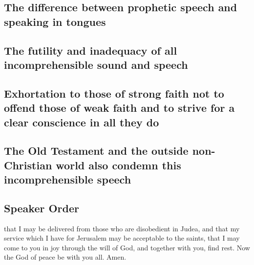 \hypertarget{the-difference-between-prophetic-speech-and-speaking-in-tongues}{%
\subsection{The difference between prophetic speech and speaking in
tongues}\label{the-difference-between-prophetic-speech-and-speaking-in-tongues}}

\hypertarget{the-futility-and-inadequacy-of-all-incomprehensible-sound-and-speech}{%
\subsection{The futility and inadequacy of all incomprehensible sound
and
speech}\label{the-futility-and-inadequacy-of-all-incomprehensible-sound-and-speech}}

\hypertarget{exhortation-to-those-of-strong-faith-not-to-offend-those-of-weak-faith-and-to-strive-for-a-clear-conscience-in-all-they-do}{%
\subsection{Exhortation to those of strong faith not to offend those of
weak faith and to strive for a clear conscience in all they
do}\label{exhortation-to-those-of-strong-faith-not-to-offend-those-of-weak-faith-and-to-strive-for-a-clear-conscience-in-all-they-do}}

\hypertarget{the-old-testament-and-the-outside-non-christian-world-also-condemn-this-incomprehensible-speech}{%
\subsection{The Old Testament and the outside non-Christian world also
condemn this incomprehensible
speech}\label{the-old-testament-and-the-outside-non-christian-world-also-condemn-this-incomprehensible-speech}}

\hypertarget{speaker-order}{%
\subsection{Speaker Order}\label{speaker-order}}

 that I may be delivered from those who are disobedient
in Judea, and that my service which I have for Jerusalem may be
acceptable to the saints,  that I may come to you in joy
through the will of God, and together with you, find rest.
 Now the God of peace be with you all. Amen.

